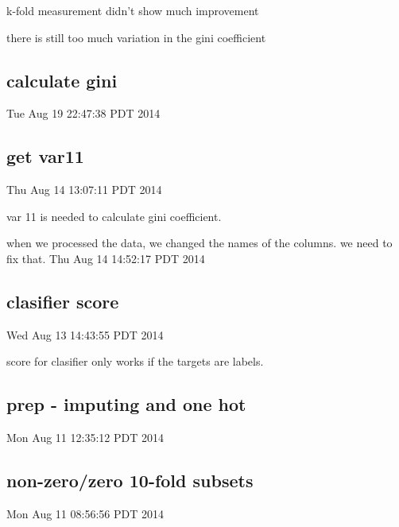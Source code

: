 \documentclass{article}
\begin{document}
k-fold measurement didn't show much improvement

there is still too much variation in the gini coefficient 

\subsection{calculate gini}
Tue Aug 19 22:47:38 PDT 2014
\subsection{get var11}
Thu Aug 14 13:07:11 PDT 2014

var 11 is needed to calculate gini coefficient.

when we processed the data, we changed the names of the columns. we need to fix that.
Thu Aug 14 14:52:17 PDT 2014
\subsection{clasifier score}
Wed Aug 13 14:43:55 PDT 2014

score for clasifier only works if the targets are labels.
\subsection{prep - imputing and one hot}
Mon Aug 11 12:35:12 PDT 2014
\subsection{non-zero/zero 10-fold subsets}
Mon Aug 11 08:56:56 PDT 2014
\end{document}
